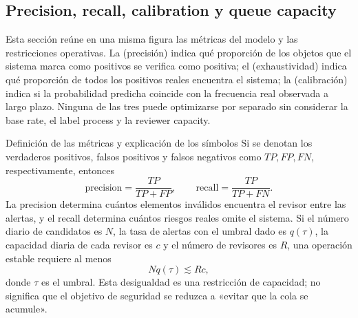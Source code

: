 
\subsection{Precision, recall, calibration y queue capacity}

Esta sección reúne en una misma figura las métricas del modelo y las restricciones operativas. La  (precisión) indica qué proporción de los objetos que el sistema marca como positivos se verifica como positiva; el  (exhaustividad) indica qué proporción de todos los positivos reales encuentra el sistema; la  (calibración) indica si la probabilidad predicha coincide con la frecuencia real observada a largo plazo. Ninguna de las tres puede optimizarse por separado sin considerar la base rate, el label process y la reviewer capacity.


\begin{importantbox}{Definición de las métricas y explicación de los símbolos}
Si se denotan los verdaderos positivos, falsos positivos y falsos negativos como $TP,FP,FN$, respectivamente, entonces
\[
\mathrm{precision}=\frac{TP}{TP+FP},\qquad
\mathrm{recall}=\frac{TP}{TP+FN}.
\]
La precision determina cuántos elementos inválidos encuentra el revisor entre las alertas, y el recall determina cuántos riesgos reales omite el sistema. Si el número diario de candidatos es $N$, la tasa de alertas con el umbral dado es $q(\tau)$, la capacidad diaria de cada revisor es $c$ y el número de revisores es $R$, una operación estable requiere al menos
\[
Nq(\tau) \lesssim Rc,
\]
donde $\tau$ es el umbral. Esta desigualdad es una restricción de capacidad; no significa que el objetivo de seguridad se reduzca a «evitar que la cola se acumule».
\end{importantbox}

